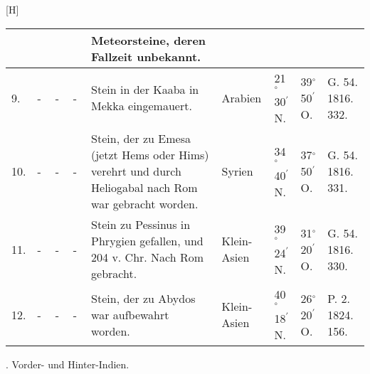 \documentclass[a4paper, 8pt, oneside, polutonikogreek, german]{article}
\begin{document}
\begin{center}[H]
\begin{longtable}{|p{3mm}|p{12mm}|p{5mm}|p{13mm}|p{25mm}|p{17mm}|p{10mm}|p{10mm}|p{11mm}|}
          &   &   &   & Meteorsteine, deren Fallzeit unbekannt. &   &   &   &   \\ \hline
        9. & - & - & - & Stein in der Kaaba in Mekka eingemauert. & Arabien & 21$^\circ$ 30$^\prime$ N. & 39$^\circ$ 50$^\prime$ O. & G. 54. 1816. 332. \\ \hline
        10. & - & - & - & Stein, der zu Emesa (jetzt Hems oder Hims) verehrt und durch Heliogabal nach Rom war gebracht worden. & Syrien & 34$^\circ$ 40$^\prime$ N. & 37$^\circ$ 50$^\prime$ O. & G. 54. 1816. 331. \\ \hline
        11. & - & - & - & Stein zu Pessinus in Phrygien gefallen, und 204 v. Chr. Nach Rom gebracht. & Klein-Asien & 39$^\circ$ 24$^\prime$ N. & 31$^\circ$ 20$^\prime$ O. & G. 54. 1816. 330. \\ \hline
        12. & - & - & - & Stein, der zu Abydos war aufbewahrt worden. & Klein-Asien & 40$^\circ$ 18$^\prime$ N. & 26$^\circ$ 20$^\prime$ O. & P. 2. 1824. 156. \\ \hline
    \end{longtable}
\end{center}
. Vorder- und Hinter-Indien.
\end{document}
